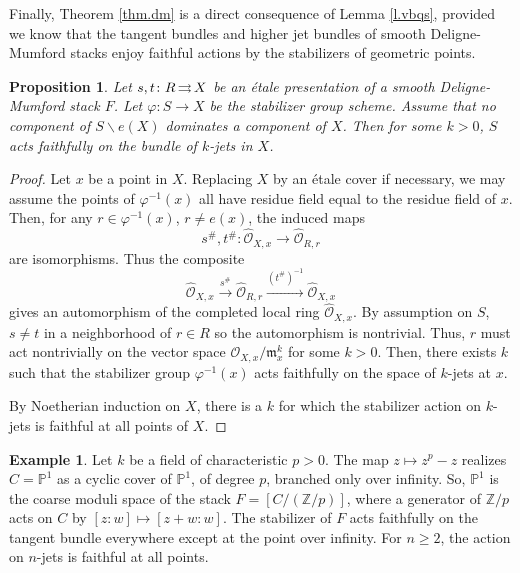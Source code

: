 \documentclass[12pt]{amsart}
\newcommand{\Z}{{\mathbb Z}}
\newcommand{\bP}{{\mathbb P}}
\newcommand{\toto}{\operatornamewithlimits{\rightrightarrows}}
\theoremstyle{plain}
\newtheorem  {prop} [thm] {Proposition}
\theoremstyle{definition}
\newtheorem  {exml} [thm] {Example}
\theoremstyle{remark}
\begin{document}
Finally, Theorem \ref{thm.dm} is a direct consequence
of Lemma \ref{l.vbqs},
provided we know that the tangent bundles
and higher jet bundles of smooth Deligne-Mumford stacks enjoy
faithful actions by the stabilizers of geometric points.

\begin{prop} Let $s,t\colon R\toto X$
be an \'etale presentation
of a smooth Deligne-Mumford stack $F$.
Let $\varphi\colon S \rightarrow X$ be the stabilizer group scheme. Assume
that no component of $S \smallsetminus e(X)$ dominates a component of $X$.
Then for some 
$k > 0$,
$S$ acts faithfully on the bundle
of $k$-jets in $X$.
\end{prop}

\begin{proof}
Let $x$ be a point in $X$.
Replacing $X$ by an \'etale cover if necessary, we may assume
the points of $\varphi^{-1}(x)$ all have residue field equal to the
residue field of $x$.
Then, for any $r\in \varphi^{-1}(x)$, $r\ne e(x)$,
the induced maps 
$$s^\#,t^\#\colon \widehat{{\mathcal O}}_{X,x}\rightarrow 
\widehat{{\mathcal O}}_{R,r}$$ are isomorphisms. 
Thus the composite
$$\widehat{{\mathcal O}}_{X,x} \stackrel{s^\#} \rightarrow
\widehat{{\mathcal O}}_{R,r} \stackrel{(t^{\#})^{-1}} \rightarrow 
\widehat{{\mathcal O}}_{X,x}$$ gives an automorphism
of the completed local ring $\widehat{{\mathcal O}}_{X,x}$.
By assumption on $S$, $s \neq t$ in a neighborhood
of $r \in R$ so the automorphism is nontrivial.
Thus, $r$ must act nontrivially on the vector space
${\mathcal O}_{X,x}/ {\mathfrak m}_x^k$
for some $k>0$.
Then, there exists $k$ such that the stabilizer group $\varphi^{-1}(x)$ acts
faithfully on
the space of $k$-jets at $x$.

By Noetherian induction on $X$, there is a $k$ for which the stabilizer
action on $k$-jets is faithful at all points of $X$.
\end{proof}

\begin{exml}
Let $k$ be a field of characteristic $p>0$.
The map $z\mapsto z^p-z$ realizes $C=\bP^1$ as a cyclic cover
of $\bP^1$, of degree $p$, branched only over infinity.
So, $\bP^1$ is the
coarse moduli space of the stack $F=[C/(\Z/p)]$, where a generator
of $\Z/p$ acts on $C$ by $[z:w]\mapsto [z+w:w]$.
The stabilizer of $F$ acts faithfully on the tangent bundle everywhere
except at the point over infinity.
For $n\ge 2$, the action on $n$-jets is faithful at all points.
\end{exml}
 
\end{document}
